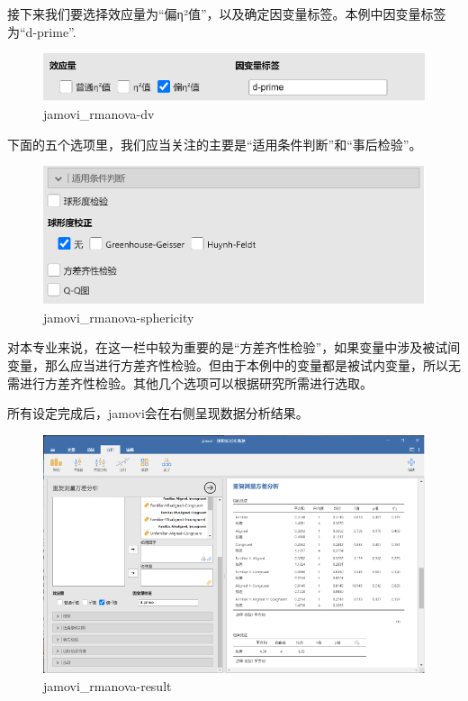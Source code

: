 \documentclass[
]{book}
\begin{document}
接下来我们要选择效应量为``偏η²值''，以及确定因变量标签。本例中因变量标签为``d-prime''.

\begin{figure}
\centering
\includegraphics{img/jamovi/rmanova-dv.png}
\caption{jamovi\_rmanova-dv}
\end{figure}

下面的五个选项里，我们应当关注的主要是``适用条件判断''和``事后检验''。

\begin{figure}
\centering
\includegraphics{img/jamovi/rmanova-sphericity.png}
\caption{jamovi\_rmanova-sphericity}
\end{figure}

对本专业来说，在这一栏中较为重要的是``方差齐性检验''，如果变量中涉及被试间变量，那么应当进行方差齐性检验。但由于本例中的变量都是被试内变量，所以无需进行方差齐性检验。其他几个选项可以根据研究所需进行选取。

所有设定完成后，jamovi会在右侧呈现数据分析结果。

\begin{figure}
\centering
\includegraphics{img/jamovi/rmanova-result.png}
\caption{jamovi\_rmanova-result}
\end{figure}
\end{document}
